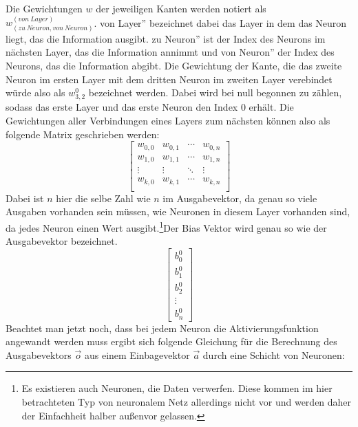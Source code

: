 \documentclass{article}
\begin{document}
Die Gewichtungen $w$ der jeweiligen Kanten werden notiert als $w^{(von\ Layer)}_{(zu\ Neuron, von\ Neuron)}$. \glqq von Layer'' bezeichnet dabei das Layer in dem das Neuron liegt, das die Information ausgibt. \glqq zu Neuron'' ist der Index des Neurons im nächsten Layer, das die Information annimmt und \glqq von Neuron'' der Index des Neurons, das die Information abgibt. Die Gewichtung der Kante, die das zweite Neuron im ersten Layer mit dem dritten Neuron im zweiten Layer verebindet würde also als $w^0_{3,2}$ bezeichnet werden. Dabei wird bei null begonnen zu zählen, sodass das erste Layer und das erste Neuron den Index 0 erhält.\newline
Die Gewichtungen aller Verbindungen eines Layers zum nächsten können also als folgende Matrix geschrieben werden:
\begin{equation*}
	\begin{bmatrix}
	w_{0,0} & w_{0,1} & \cdots & w_{0,n}\\
	w_{1,0} & w_{1,1} & \cdots & w_{1,n}\\
	\vdots & \vdots & \ddots & \vdots\\
	w_{k,0} & w_{k,1} & \cdots & w_{k,n}\\
	\end{bmatrix}
\end{equation*}
Dabei ist $n$ hier die selbe Zahl wie $n$ im Ausgabevektor, da genau so viele Ausgaben vorhanden sein müssen, wie Neuronen in diesem Layer vorhanden sind, da jedes Neuron einen Wert ausgibt.\footnote{Es existieren auch Neuronen, die Daten verwerfen. Diese kommen im hier betrachteten Typ von neuronalem Netz allerdings nicht vor und werden daher der Einfachheit halber außenvor gelassen.}Der Bias Vektor wird genau so wie der Ausgabevektor bezeichnet.
\begin{equation*}
\begin{bmatrix}
	b^0_0\\
	b^0_1\\
	b^0_2\\
	\vdots\\
	b^0_n
\end{bmatrix}
\end{equation*}
Beachtet man jetzt noch, dass bei jedem Neuron die Aktivierungsfunktion angewandt werden muss ergibt sich folgende Gleichung für die Berechnung des Ausgabevektors $\vec{o}$ aus einem Einbagevektor $\vec{a}$ durch eine Schicht von Neuronen:
\end{document}
